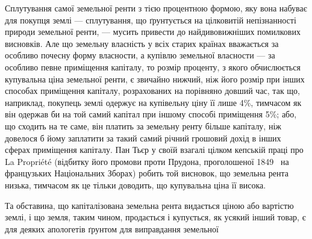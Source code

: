 Сплутування самої земельної ренти з тією процентною формою, яку вона
набуває для покупця землі — сплутування, що ґрунтується на цілковитій
непізнанності природи земельної ренти, — мусить привести до найдивовижніших
помилкових висновків. Але що земельну власність у всіх старих країнах
вважається за особливо почесну форму власности, а купівлю земельної власности
— за особливо певне приміщення капіталу, то розмір проценту, з якого
обчислюється купувальна ціна земельної ренти, є звичайно нижчий, ніж його розмір
при інших способах приміщення капіталу, розрахованих на порівняно довший час,
так що, наприклад, покупець землі одержує на купівельну ціну її лише 4\%, тимчасом
як він одержав би на той самий капітал при іншому способі приміщення 5\%;
або, що сходить на те саме, він платить за земельну ренту більше капіталу,
ніж довелося б йому заплатити за такий самий річний грошовий дохід в інших
сферах приміщення капіталу. Пан Тьєр у своїй взагалі цілком кепській праці про
La Propriété (відбитку його промови проти Прудона, проголошеної 1849~ на французьких
Національних Зборах) робить той висновок, що земельна рента низька,
тимчасом як це тільки доводить, що купувальна ціна її висока.

Та обставина, що капіталізована земельна рента видається ціною або
вартістю землі, і що земля, таким чином, продається і купується, як усякий
інший товар, є для деяких апологетів ґрунтом для виправдання земельної
\parbreak{}  %
